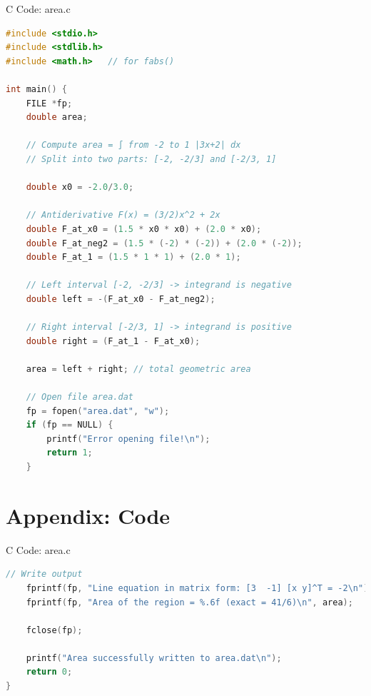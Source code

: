 \documentclass{beamer}
\numberwithin{equation}{section}
\theoremstyle{remark}
\begin{document}
\begin{frame}[fragile]{C Code: area.c}
\begin{lstlisting}[language=C]
#include <stdio.h>
#include <stdlib.h>
#include <math.h>   // for fabs()

int main() {
    FILE *fp;
    double area;

    // Compute area = ∫ from -2 to 1 |3x+2| dx
    // Split into two parts: [-2, -2/3] and [-2/3, 1]

    double x0 = -2.0/3.0;

    // Antiderivative F(x) = (3/2)x^2 + 2x
    double F_at_x0 = (1.5 * x0 * x0) + (2.0 * x0);
    double F_at_neg2 = (1.5 * (-2) * (-2)) + (2.0 * (-2));
    double F_at_1 = (1.5 * 1 * 1) + (2.0 * 1);

    // Left interval [-2, -2/3] -> integrand is negative
    double left = -(F_at_x0 - F_at_neg2);

    // Right interval [-2/3, 1] -> integrand is positive
    double right = (F_at_1 - F_at_x0);

    area = left + right; // total geometric area

    // Open file area.dat
    fp = fopen("area.dat", "w");
    if (fp == NULL) {
        printf("Error opening file!\n");
        return 1;
    }
\end{lstlisting}
\end{frame}

\section*{Appendix: Code}

\begin{frame}[fragile]{C Code: area.c}
\begin{lstlisting}[language=C]
    // Write output
    fprintf(fp, "Line equation in matrix form: [3  -1] [x y]^T = -2\n");
    fprintf(fp, "Area of the region = %.6f (exact = 41/6)\n", area);

    fclose(fp);

    printf("Area successfully written to area.dat\n");
    return 0;
}
\end{lstlisting}
\end{frame}
\end{document}
